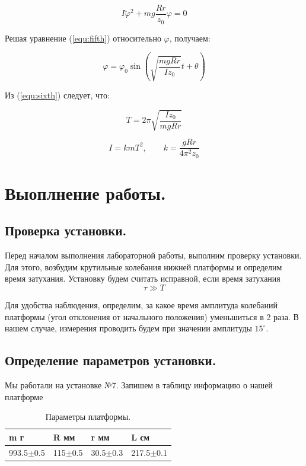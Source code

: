 \documentclass[12pt,a4paper]{article}
\begin{document}
	\begin{equation}
		 I\ddot{\varphi}^2 + mg\frac{Rr}{z_{0}}\varphi= 0
		 \label{equ:fifth}	
	\end{equation}
	
	
		Решая уравнение (\ref{equ:fifth}) относительно $\varphi$, получаем:
			
	
	\begin{equation}
		\varphi = \varphi_{0}\sin\left(\sqrt{\frac{mgRr}{Iz_{0}}}t + \theta\right)
		\label{equ:sixth}
	\end{equation}
	
	
	Из (\ref{equ:sixth}) следует, что:
	
	\begin{equation}
		T = 2\pi\sqrt{\frac{Iz_{0}}{mgRr}}		
	\end{equation}
	
	\begin{equation}
		I = kmT^2, \qquad k = \frac{gRr}{4\pi^2z_{0}}
		\label{equ:seventh}
	\end{equation}

	\newpage	

\section{Выоплнение работы.}

	\subsection{Проверка установки.}
		
		\qquad  Перед началом выполнения лабораторной работы, выполним проверку установки. Для этого, возбудим крутильные колебания нижней платформы и определим время затухания. Установку будем считать исправной, если время затухания $$\tau \gg T$$
		
		Для удобства наблюдения, определим, за какое время амплитуда колебаний платформы (угол отклонения от начального положения) уменьшиться в 2 раза.
      В нашем случае, измерения проводить будем при значении амплитуды $15^{\circ}$.
		
	
		
		\subsection{Определение параметров установки.}
		Мы работали на установке №7. Запишем в таблицу информацию о нашей платформе
		\begin{table}[h!]
			\begin{center}
			\begin{tabular}{| l | l | l | l |}
					\hline
					m г & R мм & r мм & L см \\ \hline
					993.5$\pm$0.5 & 115$\pm$0.5 & 30.5$\pm$0.3 & 217.5$\pm$0.1 \\
					\hline
				\end{tabular}
			\end{center}
			\caption{Параметры платформы.}
			\label{tab:parametrs}
		\end{table}
		
\end{document}
